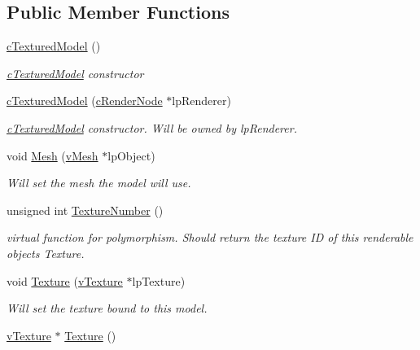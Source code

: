 \subsection*{Public Member Functions}
\begin{DoxyCompactItemize}
\item 
\hyperlink{classc_textured_model_a9f3b3307b1b84971f5386c5346537cf1}{cTexturedModel} ()
\begin{DoxyCompactList}\small\item\em \hyperlink{classc_textured_model}{cTexturedModel} constructor \item\end{DoxyCompactList}\item 
\hyperlink{classc_textured_model_afd2b15449dc747d6dc1d2985373192a3}{cTexturedModel} (\hyperlink{classc_render_node}{cRenderNode} $\ast$lpRenderer)
\begin{DoxyCompactList}\small\item\em \hyperlink{classc_textured_model}{cTexturedModel} constructor. Will be owned by lpRenderer. \item\end{DoxyCompactList}\item 
void \hyperlink{classc_textured_model_a83915e45624acbd6d19e295e0913c407}{Mesh} (\hyperlink{classv_mesh}{vMesh} $\ast$lpObject)
\begin{DoxyCompactList}\small\item\em Will set the mesh the model will use. \item\end{DoxyCompactList}\item 
unsigned int \hyperlink{classc_textured_model_ad999c8e0163c533f522de8170717e1b8}{TextureNumber} ()
\begin{DoxyCompactList}\small\item\em virtual function for polymorphism. Should return the texture ID of this renderable objects Texture. \item\end{DoxyCompactList}\item 
void \hyperlink{classc_textured_model_a57abb745701721d30ac53cf93b9d6294}{Texture} (\hyperlink{classv_texture}{vTexture} $\ast$lpTexture)
\begin{DoxyCompactList}\small\item\em Will set the texture bound to this model. \item\end{DoxyCompactList}\item 
\hyperlink{classv_texture}{vTexture} $\ast$ \hyperlink{classc_textured_model_a782e8bdbcaf7ffedcba8ff521ba73ff2}{Texture} ()

\end{DoxyCompactItemize}
